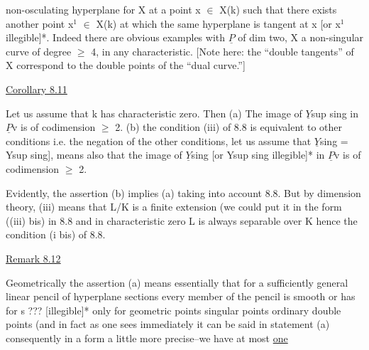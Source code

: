
non-osculating hyperplane for X at a point x $\in$ X(k) such that
there exists another point x$^{1}$ $\in$ X(k) at which the same hyperplane
is tangent at x [or x$^{1}$ illegible]*. Indeed there are obvious
examples with $\underline{P}$ of dim two, X a non-singular curve of degree $\geq$ 4,
in any characteristic. [Note here: the ``double tangents'' of X
correspond to the double points of the ``dual curve.'']

\uline{Corollary 8.11}

Let us assume that k has characteristic zero. Then (a) The
image of $\underline{Y}$sup sing in $\underline{P}$v is of codimension $\geq$ 2. (b) the condition
(iii) of 8.8 is equivalent to other conditions i.e. the negation
of the other conditions, let us assume that $\underline{Y}$sing = Ysup sing], means
also that the image of $\underline{Y}$sing [or Ysup sing illegible]* in $\underline{P}$v is of
codimension $\geq$ 2.

Evidently, the assertion (b) implies (a) taking into account
8.8. But by dimension theory, (iii) means that L/K is a finite
extension (we could put it in the form ((iii) bis) in 8.8 and in
characteristic zero L is always separable over K hence the
condition (i bis) of 8.8.

\uline{Remark 8.12}

Geometrically the assertion (a) means essentially that for a
sufficiently general linear pencil of hyperplane sections every
member of the pencil is smooth or has for s ??? [illegible]* only
for geometric points singular points ordinary double points (and
in fact as one sees immediately it can be said in statement (a)
consequently in a form a little more precise--we have at most \uline{one}

